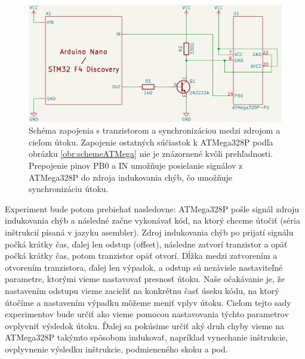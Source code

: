 \begin{figure}
    \centerline{\includegraphics[width=1\textwidth]{images/schemeExpTranz.png}}
    \caption[Schéma zapojenia s tranzistorom a synchronizáciou]{Schéma zapojenia s tranzistorom a synchronizáciou medzi zdrojom a cieľom útoku. Zapojenie ostatných súčiastok k ATMega328P podľa obrázku \ref{obr:schemeATMega} nie je znázornené kvôli prehľadnosti. Prepojenie pinov PB0 a IN umožňuje posielanie signálov z ATMega328P do zdroja indukovania chýb, čo umožňuje synchronizáciu útoku.}
    \label{obr:schemeExpTranz}
\end{figure}

Experiment bude potom prebiehať nasledovne: ATMega328P pošle signál zdroju indukovania chýb a následné začne vykonávať kód, na ktorý chceme útočiť (séria inštrukcií písaná v jazyku asembler). Zdroj indukovania chýb po prijatí signálu počká krátky čas, ďalej len odstup (offset), následne zatvorí tranzistor a opäť počká krátky čas, potom tranzistor opäť otvorí. Dĺžka medzi zatvorením a otvorením tranzistora, ďalej len výpadok, a odstup sú nezávisle nastaviteľné parametre, ktorými vieme nastavovať presnosť útoku. Naše očakávanie je, že nastavením odstupu vieme zacieliť na konkrétnu časť úseku kódu, na ktorý útočíme a nastavením výpadku môžeme meniť vplyv útoku. Cieľom tejto sady experimentov bude určiť ako vieme pomocou nastavovania týchto parametrov ovplyvniť výsledok útoku. Ďalej sa pokúsime určiť aký druh chyby vieme na ATMega328P takýmto spôsobom indukovať, napríklad vynechanie inštrukcie, ovplyvnenie výsledku inštrukcie, podmieneného skoku a pod.

